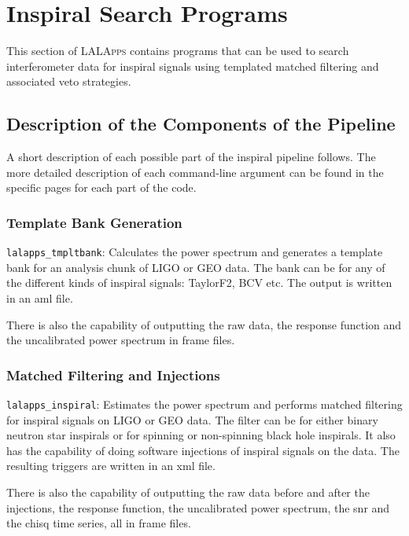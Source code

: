 \chapter{Inspiral Search Programs}
\label{chapter:inspiral}

This section of \textsc{LALApps} contains programs that can be used to search
interferometer data for inspiral signals using templated matched filtering and
associated veto strategies.

\section{Description of the Components of the Pipeline}

A short description of each possible part of the inspiral pipeline follows. 
The more detailed description of each command-line argument can be found in 
the specific pages for each part of the code.

\subsection{Template Bank Generation}

\texttt{lalapps\_tmpltbank}: Calculates the power spectrum and generates a 
template bank for an analysis
chunk of LIGO or GEO data. The bank can be for any of the different kinds of
inspiral signals: TaylorF2, BCV etc. The output is written in an aml file.

There is also the capability of outputting the raw data,
the response function and the uncalibrated power spectrum in
frame files.

\subsection{Matched Filtering and Injections}

\texttt{lalapps\_inspiral}: Estimates the power spectrum and performs matched 
filtering for inspiral signals on LIGO or GEO data. The filter can be for
either binary neutron star inspirals or for spinning or non-spinning black 
hole inspirals.
It also has the capability of doing software injections of 
inspiral signals on the data. The resulting triggers are written in an xml
file.

There is also the capability of outputting the raw data before and after the
injections, the response function, the uncalibrated power spectrum, the snr
and the chisq time series, all in frame files.

